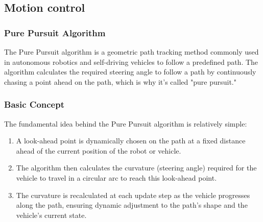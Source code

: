 \documentclass{article}
\begin{document}
	\subsection{Motion control}
	\subsubsection{Pure Pursuit Algorithm}
	The Pure Pursuit algorithm is a geometric path tracking method commonly used in autonomous robotics and self-driving vehicles to follow a predefined path. The algorithm calculates the required steering angle to follow a path by continuously chasing a point ahead on the path, which is why it's called "pure pursuit."
	
	\subsubsection*{Basic Concept}
	The fundamental idea behind the Pure Pursuit algorithm is relatively simple:
	\begin{enumerate}
		\item A look-ahead point is dynamically chosen on the path at a fixed distance ahead of the current position of the robot or vehicle.
	
		\item The algorithm then calculates the curvature (steering angle) required for the vehicle to travel in a circular arc to reach this look-ahead point.
		
		\item The curvature is recalculated at each update step as the vehicle progresses along the path, ensuring dynamic adjustment to the path's shape and the vehicle's current state.
	\end{enumerate}
\end{document}
